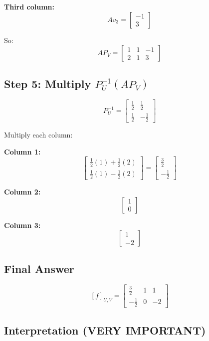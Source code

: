 \documentclass[11pt]{article}
\begin{document}
\textbf{Third column:}
\[
A v_3 =
\begin{bmatrix}
-1 \\
3
\end{bmatrix}
\]

So:
\[
A P_V =
\begin{bmatrix}
1 & 1 & -1 \\
2 & 1 & 3
\end{bmatrix}
\]

\hrulefill

\subsection*{Step 5: Multiply $P_U^{-1}(A P_V)$}

\[
P_U^{-1} =
\begin{bmatrix}
\frac{1}{2} & \frac{1}{2} \\
\frac{1}{2} & -\frac{1}{2}
\end{bmatrix}
\]

Multiply each column:

\textbf{Column 1:}
\[
\begin{bmatrix}
\frac{1}{2}(1) + \frac{1}{2}(2) \\
\frac{1}{2}(1) - \frac{1}{2}(2)
\end{bmatrix}
=
\begin{bmatrix}
\frac{3}{2} \\
-\frac{1}{2}
\end{bmatrix}
\]

\textbf{Column 2:}
\[
\begin{bmatrix}
1 \\
0
\end{bmatrix}
\]

\textbf{Column 3:}
\[
\begin{bmatrix}
1 \\
-2
\end{bmatrix}
\]

\subsection*{Final Answer}

\[
[f]_{U,V} =
\begin{bmatrix}
\frac{3}{2} & 1 & 1 \\
-\frac{1}{2} & 0 & -2
\end{bmatrix}
\]

\hrulefill

\subsection*{Interpretation (VERY IMPORTANT)}
\end{document}
